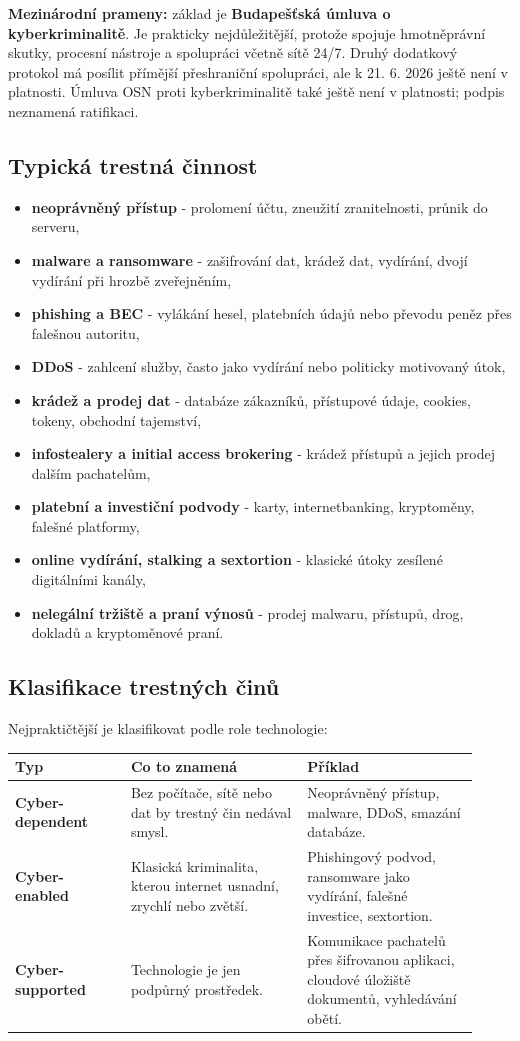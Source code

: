 \textbf{Mezinárodní prameny:} základ je \textbf{Budapešťská úmluva o kyberkriminalitě}. Je prakticky nejdůležitější, protože spojuje hmotněprávní skutky, procesní nástroje a spolupráci včetně sítě 24/7. Druhý dodatkový protokol má posílit přímější přeshraniční spolupráci, ale k 21. 6. 2026 ještě není v platnosti. Úmluva OSN proti kyberkriminalitě také ještě není v platnosti; podpis neznamená ratifikaci.

\subsection*{Typická trestná činnost}
\begin{itemize}
  \item \textbf{neoprávněný přístup} - prolomení účtu, zneužití zranitelnosti, průnik do serveru,
  \item \textbf{malware a ransomware} - zašifrování dat, krádež dat, vydírání, dvojí vydírání při hrozbě zveřejněním,
  \item \textbf{phishing a BEC} - vylákání hesel, platebních údajů nebo převodu peněz přes falešnou autoritu,
  \item \textbf{DDoS} - zahlcení služby, často jako vydírání nebo politicky motivovaný útok,
  \item \textbf{krádež a prodej dat} - databáze zákazníků, přístupové údaje, cookies, tokeny, obchodní tajemství,
  \item \textbf{infostealery a initial access brokering} - krádež přístupů a jejich prodej dalším pachatelům,
  \item \textbf{platební a investiční podvody} - karty, internetbanking, kryptoměny, falešné platformy,
  \item \textbf{online vydírání, stalking a sextortion} - klasické útoky zesílené digitálními kanály,
  \item \textbf{nelegální tržiště a praní výnosů} - prodej malwaru, přístupů, drog, dokladů a kryptoměnové praní.
\end{itemize}

\subsection*{Klasifikace trestných činů}
Nejpraktičtější je klasifikovat podle role technologie:
\begin{longtable}{p{0.23\linewidth}p{0.35\linewidth}p{0.34\linewidth}}
\toprule
\textbf{Typ} & \textbf{Co to znamená} & \textbf{Příklad}\\
\midrule
\textbf{Cyber-dependent} & Bez počítače, sítě nebo dat by trestný čin nedával smysl. & Neoprávněný přístup, malware, DDoS, smazání databáze.\\
\addlinespace
\textbf{Cyber-enabled} & Klasická kriminalita, kterou internet usnadní, zrychlí nebo zvětší. & Phishingový podvod, ransomware jako vydírání, falešné investice, sextortion.\\
\addlinespace
\textbf{Cyber-supported} & Technologie je jen podpůrný prostředek. & Komunikace pachatelů přes šifrovanou aplikaci, cloudové úložiště dokumentů, vyhledávání obětí.\\
\bottomrule
\end{longtable}

